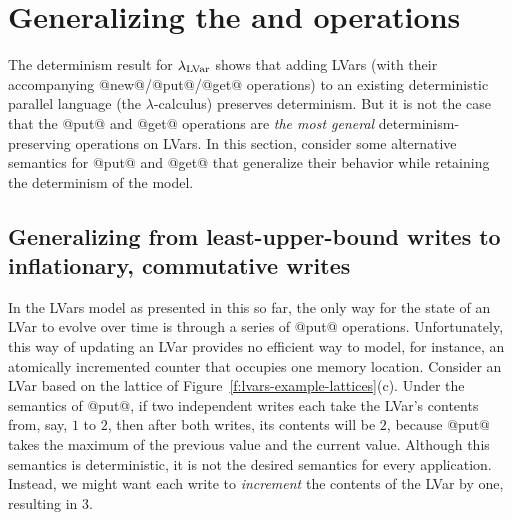 \section{Generalizing the  and  operations}\label{s:lvars-generalizing}

The determinism result for $\lambda_{\textrm{LVar}}$ shows that adding LVars (with
their accompanying @new@/@put@/@get@ operations) to an existing
deterministic parallel language (the $\lambda$-calculus) preserves
determinism.  But it is not the case that the @put@ and @get@
operations are \emph{the most general} determinism-preserving
operations on LVars.  In this section,  consider some alternative
semantics for @put@ and @get@ that generalize their behavior while
retaining the determinism of the model.

\subsection{Generalizing from least-upper-bound writes to inflationary, commutative writes}\label{subsection:lvars-generalizing-from-least-upper-bound-writes}

In the LVars model as presented in this  so far, the only way
for the state of an LVar to evolve over time is through a series of
@put@ operations.  Unfortunately, this way of updating an LVar
provides no efficient way to model, for instance, an atomically
incremented counter that occupies one memory location.  Consider an
LVar based on the lattice of Figure~\ref{f:lvars-example-lattices}(c).
Under the semantics of @put@, if two independent writes each take the
LVar's contents from, say, $1$ to $2$, then after both writes, its
contents will be $2$, because @put@ takes the maximum of the previous
value and the current value.  Although this semantics is
deterministic, it is not the desired semantics for every application.
Instead, we might want each write to \emph{increment} the contents of
the LVar by one, resulting in $3$.


